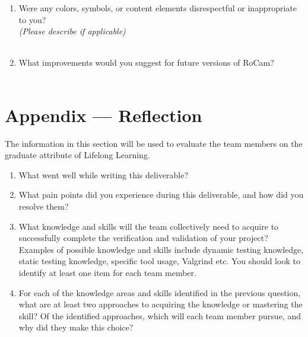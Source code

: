 \documentclass[12pt, titlepage]{article}
\begin{document}
\begin{enumerate}
  \item Were any colors, symbols, or content elements disrespectful or inappropriate to
        you?\\ \textit{(Please describe if applicable)}\\[1em]
        \makebox[0.95\textwidth]{\hrulefill}\\[0.5em]
        \makebox[0.95\textwidth]{\hrulefill}
  \item What improvements would you suggest for future versions of RoCam?\\[1em]
        \makebox[0.95\textwidth]{\hrulefill}\\[0.5em]
        \makebox[0.95\textwidth]{\hrulefill}
\end{enumerate}

\newpage{}
\section*{Appendix --- Reflection}

The information in this section will be used to evaluate the team members on
the graduate attribute of Lifelong Learning.



\begin{enumerate}
  \item What went well while writing this deliverable?
  \item What pain points did you experience during this deliverable, and how did you
        resolve them?
  \item What knowledge and skills will the team collectively need to acquire to
        successfully complete the verification and validation of your project? Examples
        of possible knowledge and skills include dynamic testing knowledge, static
        testing knowledge, specific tool usage, Valgrind etc. You should look to
        identify at least one item for each team member.
  \item For each of the knowledge areas and skills identified in the previous question,
        what are at least two approaches to acquiring the knowledge or mastering the
        skill? Of the identified approaches, which will each team member pursue, and
        why did they make this choice?
\end{enumerate}
\end{document}

